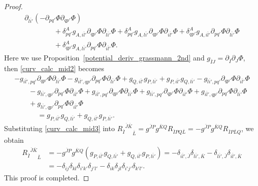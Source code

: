 \documentclass[pdftex]{sigma}
\numberwithin{equation}{section}
\begin{document}
\begin{proof}
\begin{gather}
 \partial_{\overline{li'}}
 (
 -
 \partial_{pq'}\Phi
 \partial_{qp'}\Phi
 )
 \nonumber
 \\
 \phantom{\qquad
 +=}{}
 +
 \delta^{A}_{pq'}
 g_{A,\overline{il'}}
 \partial_{qp'}\Phi
 \partial_{\overline{li'}}\Phi
 +
 \delta^{A}_{pq'}
 g_{A,\overline{li'}}
 \partial_{qp'}\Phi
 \partial_{\overline{il'}}\Phi
 +
 \delta^{A}_{qp'}
 g_{A,\overline{il'}}
 \partial_{pq'}\Phi
 \partial_{\overline{li'}}\Phi \nonumber
 \\
 \phantom{\qquad
 +=}{}
 +
 \delta^{A}_{qp'}
 g_{A,\overline{li'}}
 \partial_{pq'}\Phi
 \partial_{\overline{il'}}\Phi.
 \label{curv_calc_mid2}
\end{gather}
Here we use Proposition~\ref{potential_deriv_grassmann_2nd} and
$
 g_{\overline{I}J}
 =
 \partial_{\overline{I}}
 \partial_{J}
 \Phi
$,
then \eqref{curv_calc_mid2} becomes
\begin{gather}
 -
 g_{\overline{il'},pq'}
 \partial_{qp'}\Phi
 \partial_{\overline{li'}}\Phi
 -
 g_{\overline{il'},qp'}
 \partial_{pq'}\Phi
 \partial_{\overline{li'}}\Phi
 +
 g_{Q,\overline{il'}}
 g_{P,\overline{li'}}
 +
 g_{P,\overline{il'}}
 g_{Q,\overline{li'}}
 -
 g_{\overline{li'},pq'}
 \partial_{qp'}\Phi
 \partial_{\overline{il'}}\Phi
 \nonumber
 \\
 \qquad
 {}-
 g_{\overline{li'},qp'}
 \partial_{pq'}\Phi
 \partial_{\overline{il'}}\Phi
 +
 g_{\overline{il'},pq'}
 \partial_{qp'}\Phi
 \partial_{\overline{li'}}\Phi
 +
 g_{\overline{li'},pq'}
 \partial_{qp'}\Phi
 \partial_{\overline{il'}}\Phi
 +
 g_{\overline{il'},qp'}
 \partial_{pq'}\Phi
 \partial_{\overline{li'}}\Phi \nonumber
 \\
 \qquad
 {}+
 g_{\overline{li'},qp'}
 \partial_{pq'}\Phi
 \partial_{\overline{il'}}\Phi
 \nonumber
 \\
 \phantom{
 \qquad+}{}=
 g_{P,\overline{il'}}
 g_{Q,\overline{li'}}
 +
 g_{Q,\overline{il'}}
 g_{P,\overline{li'}}.
 \label{curv_calc_mid3}
\end{gather}
Substituting \eqref{curv_calc_mid3} into
$
 {{R_{\overline{I}}}^{\overline{J} \overline{K}}}_{\overline{L}}
 =
 g^{\overline{J}P}
 g^{\overline{K}Q}
 R_{\overline{I}PQ\overline{L}}
 =
 -
 g^{\overline{J}P}
 g^{\overline{K}Q}
 R_{\overline{I}P\overline{L}Q}
$,
we obtain
\begin{align*}
 {{R_{\overline{I}}}^{\overline{J} \overline{K}}}_{\overline{L}}
 &=
 -
 g^{\overline{J}P}
 g^{\overline{K}Q}
 (
 g_{P,\overline{il'}}
 g_{Q,\overline{li'}}
 +
 g_{Q,\overline{il'}}
 g_{P,\overline{li'}}
 )
=
 -
 \delta_{
 \overline{il'},
 \overline{J}
 }
 \delta_{
 \overline{li'},
 \overline{K}
 }
 -
 \delta_{
 \overline{li'},
 \overline{J}
 }
 \delta_{
 \overline{il'},
 \overline{K}
 }
 \\
 &=
 -
 \delta_{ij}
 \delta_{kl}
 \delta_{i'k'}
 \delta_{j'l'}
 -
 \delta_{ik}
 \delta_{jl}
 \delta_{i'j'}
 \delta_{k'l'}.
\end{align*}
This proof is completed.
\end{proof}
\end{document}
